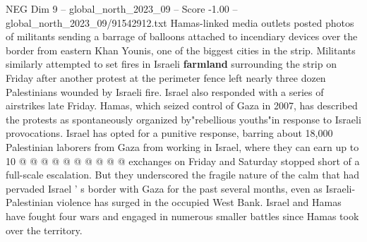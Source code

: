 \begin{textsample}{NEG Dim 9 – global\_north\_2023\_09 – Score -1.00 – global\_north\_2023\_09/91542912.txt}
Hamas-linked media outlets posted photos of militants sending a barrage of balloons attached to incendiary devices over the border from eastern Khan Younis, one of the biggest cities in the strip.
Militants similarly attempted to set fires in Israeli \textbf{farmland} surrounding the strip on Friday after another protest at the perimeter fence left nearly three dozen Palestinians wounded by Israeli fire.
Israel also responded with a series of airstrikes late Friday.
Hamas, which seized control of Gaza in 2007, has described the protests as spontaneously organized by"rebellious youths"in response to Israeli provocations.
Israel has opted for a punitive response, barring about 18,000 Palestinian laborers from Gaza from working in Israel, where they can earn up to 10 @ @ @ @ @ @ @ @ @ @ exchanges on Friday and Saturday stopped short of a full-scale escalation.
But they underscored the fragile nature of the calm that had pervaded Israel ' s border with Gaza for the past several months, even as Israeli-Palestinian violence has surged in the occupied West Bank.
Israel and Hamas have fought four wars and engaged in numerous smaller battles since Hamas took over the territory.

\end{textsample}

